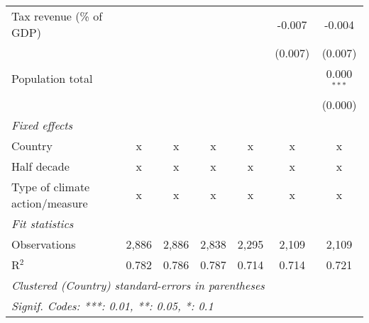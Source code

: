\begin{tabular}{lcccccc}
   Tax revenue (\% of GDP)              &              &               &               &               & -0.007        & -0.004\\   
                                        &              &               &               &               & (0.007)       & (0.007)\\   
   Population total                     &              &               &               &               &               & 0.000$^{***}$\\   
                                        &              &               &               &               &               & (0.000)\\   
   \emph{Fixed effects}\\
   Country                              & x            & x             & x             & x             & x             & x\\  
   Half decade                          & x            & x             & x             & x             & x             & x\\  
   Type of climate action/measure       & x            & x             & x             & x             & x             & x\\  
   \midrule \emph{Fit statistics}\\
   Observations                         & 2,886        & 2,886         & 2,838         & 2,295         & 2,109         & 2,109\\  
   R$^2$                                & 0.782        & 0.786         & 0.787         & 0.714         & 0.714         & 0.721\\  
   \midrule
   \multicolumn{7}{l}{\emph{Clustered (Country) standard-errors in parentheses}}\\
   \multicolumn{7}{l}{\emph{Signif. Codes: ***: 0.01, **: 0.05, *: 0.1}}\\
\end{tabular}
\par\endgroup


